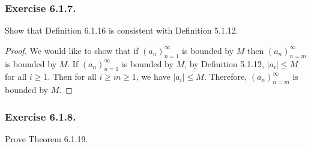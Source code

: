 \documentclass[12pt, letter]{article}
\newcommand{\an}{(a_n)_{n=m}^\infty}
\begin{document}
\subsubsection*{Exercise 6.1.7.}
Show that Definition 6.1.16 is consistent with Definition 5.1.12.
\begin{proof}
    We would like to show that if $(a_n)_{n=1}^\infty$ is bounded by $M$ then $\an$ is bounded by $M$. If $(a_n)_{n=1}^\infty$ is bounded by $M$, by Definition 5.1.12, 
    $|a_i|\leq M$ for all $i\geq 1$. Then for all $i\geq m\geq 1$, we have $|a_i|\leq M$. Therefore, $\an$ is bounded by $M$.
\end{proof}
\subsubsection*{Exercise 6.1.8.}
Prove Theorem 6.1.19.
\end{document}
